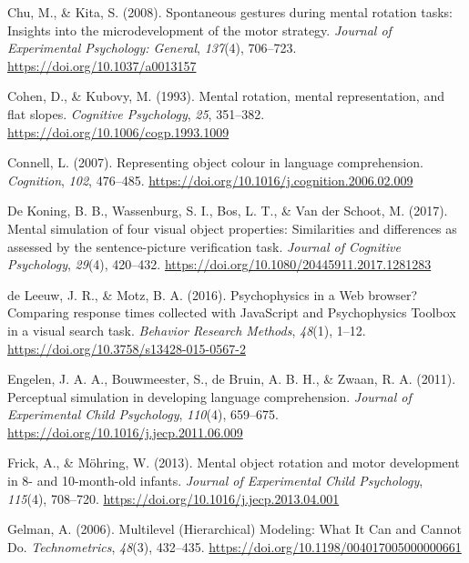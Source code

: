 \documentclass[
  man,floatsintext]{apa7}
\newlength{\cslhangindent}
\newlength{\cslentryspacingunit} %
\newenvironment{CSLReferences}[2] %
 {%
  \setlength{\parindent}{0pt}
  \ifodd #1
  \let\oldpar\par
  \def\par{\hangindent=\cslhangindent\oldpar}
  \fi
  \setlength{\parskip}{#2\cslentryspacingunit}
 }%
 {}
\begin{document}
\begin{CSLReferences}{1}{0}
\leavevmode{}%
Chu, M., \& Kita, S. (2008). Spontaneous gestures during mental rotation tasks: {Insights} into the microdevelopment of the motor strategy. \emph{Journal of Experimental Psychology: General}, \emph{137}(4), 706--723. \url{https://doi.org/10.1037/a0013157}

\leavevmode{}%
Cohen, D., \& Kubovy, M. (1993). Mental rotation, mental representation, and flat slopes. \emph{Cognitive Psychology}, \emph{25}, 351--382. \url{https://doi.org/10.1006/cogp.1993.1009}

\leavevmode{}%
Connell, L. (2007). Representing object colour in language comprehension. \emph{Cognition}, \emph{102}, 476--485. \url{https://doi.org/10.1016/j.cognition.2006.02.009}

\leavevmode{}%
De Koning, B. B., Wassenburg, S. I., Bos, L. T., \& Van der Schoot, M. (2017). Mental simulation of four visual object properties: Similarities and differences as assessed by the sentence-picture verification task. \emph{Journal of Cognitive Psychology}, \emph{29}(4), 420--432. \url{https://doi.org/10.1080/20445911.2017.1281283}

\leavevmode{}%
de Leeuw, J. R., \& Motz, B. A. (2016). Psychophysics in a {Web} browser? {Comparing} response times collected with {JavaScript} and {Psychophysics Toolbox} in a visual search task. \emph{Behavior Research Methods}, \emph{48}(1), 1--12. \url{https://doi.org/10.3758/s13428-015-0567-2}

\leavevmode{}%
Engelen, J. A. A., Bouwmeester, S., de Bruin, A. B. H., \& Zwaan, R. A. (2011). Perceptual simulation in developing language comprehension. \emph{Journal of Experimental Child Psychology}, \emph{110}(4), 659--675. \url{https://doi.org/10.1016/j.jecp.2011.06.009}

\leavevmode{}%
Frick, A., \& Möhring, W. (2013). Mental object rotation and motor development in 8- and 10-month-old infants. \emph{Journal of Experimental Child Psychology}, \emph{115}(4), 708--720. \url{https://doi.org/10.1016/j.jecp.2013.04.001}

\leavevmode{}%
Gelman, A. (2006). Multilevel ({Hierarchical}) {Modeling}: {What} {It} {Can} and {Cannot} {Do}. \emph{Technometrics}, \emph{48}(3), 432--435. \url{https://doi.org/10.1198/004017005000000661}


\end{CSLReferences}
\end{document}
